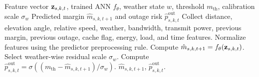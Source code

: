 \begin{algorithm}[!t]
\caption{ANN-Based Link-Risk Prediction}
\label{alg:link_prediction}
\begin{algorithmic}[1]
\REQUIRE Feature vector $\mathbf{z}_{s,k,t}$, trained ANN $f_\theta$, weather state $w$, threshold $m_{\mathrm{th}}$, calibration scale $\sigma_w$
\ENSURE Predicted margin $\hat{m}_{s,k,t+1}$ and outage risk $\hat{p}^{\mathrm{out}}_{s,k,t}$
\STATE Collect distance, elevation angle, relative speed, weather, bandwidth, transmit power, previous margin, previous outage, cache flag, energy, load, and time features.
\STATE Normalize features using the predictor preprocessing rule.
\STATE Compute $\hat{m}_{s,k,t+1}=f_\theta(\mathbf{z}_{s,k,t})$.
\STATE Select weather-wise residual scale $\sigma_w$.
\STATE Compute $\hat{p}^{\mathrm{out}}_{s,k,t}=\sigma((m_{\mathrm{th}}-\hat{m}_{s,k,t+1})/\sigma_w)$.
\RETURN $\hat{m}_{s,k,t+1}$, $\hat{p}^{\mathrm{out}}_{s,k,t}$.
\end{algorithmic}
\end{algorithm}
